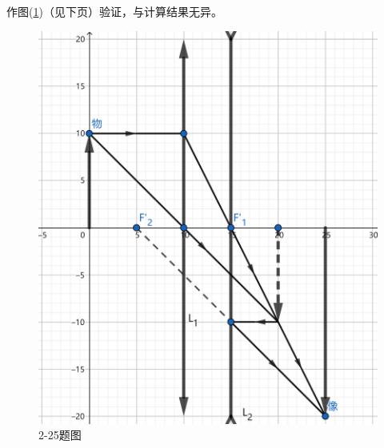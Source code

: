 \documentclass[10pt,a4paper]{article}
\theoremstyle{remark}
\begin{document}
作图(\ref{FigureofProblem2-25})（见下页）验证，与计算结果无异。
\begin{figure}
\centering
\includegraphics[scale=.3]{OpticsHomework_2_2-25(tailored).png}
\caption{2-25题图}\label{FigureofProblem2-25}
\end{figure}
\end{document}
